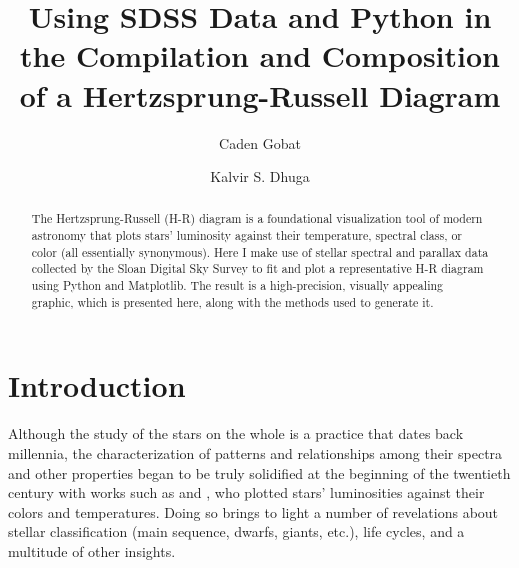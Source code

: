 \documentclass[twocolumn]{aastex63}
\begin{document}
\title{\Large{Using SDSS Data and Python in the Compilation and Composition of a Hertzsprung-Russell Diagram}}


\author[0000-0003-1268-8845]{Caden Gobat}

\author[0000-0002-5422-4873]{Kalvir S. Dhuga}


\begin{abstract}

The Hertzsprung-Russell (H-R) diagram is a foundational visualization tool of modern astronomy that plots stars' luminosity against their temperature, spectral class, or color (all essentially synonymous). Here I make use of stellar spectral and parallax data collected by the Sloan Digital Sky Survey to fit and plot a representative H-R diagram using Python and  Matplotlib. The result is a high-precision, visually appealing graphic, which is presented here, along with the methods used to generate it.

\end{abstract}



\section{Introduction} \label{sec:intro}

Although the study of the stars on the whole is a practice that dates back millennia, the characterization of patterns and relationships among their spectra and other properties began to be truly solidified at the beginning of the twentieth century with works such as \citet{Hertzsprung_1911} and \citet{Norris_1912}, who plotted stars' luminosities against their colors and temperatures. Doing so brings to light a number of revelations about stellar classification (main sequence, dwarfs, giants, etc.), life cycles, and a multitude of other insights.
\end{document}
